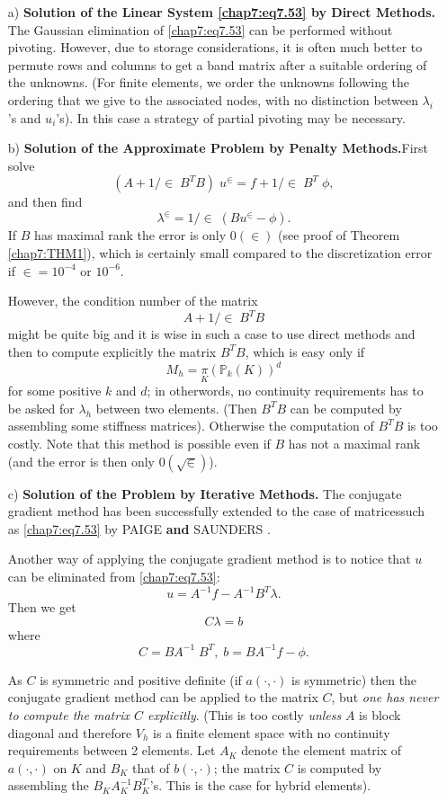 \begin{itemize}
\item [a)] {\bf Solution of the Linear System \eqref{chap7:eq7.53} by
  Direct Methods.} The Gaussian elimination of \eqref{chap7:eq7.53}
  can be performed without pivoting. However, due to storage
  considerations, it is often much better to permute rows and columns
  to get a band matrix after a suitable ordering of the unknowns. (For
  finite elements, we order the unknowns following the ordering that
  we give to the associated nodes, with no distinction between
  $\lambda_i$'s and $u_i$'s). In this case a strategy of partial
  pivoting may be necessary. 
\item [b)] {\bf Solution of the Approximate Problem by Penalty
  Methods.}\pageoriginale First solve 
$$
(A+1/\in \;B^TB)\;u^\in=f+1/\in \;B^T\;\phi,
$$
and then find 
$$
\lambda^\in=1/\in \;(Bu^\in-\phi).
$$
If $B$ has maximal rank the error is only $0(\in)$ (see proof
of Theorem \ref{chap7:THM1}), which is certainly small compared to the
discretization error if $\in =10^{-4}$ or $10^{-6}$. 

However, the condition number of the matrix 
$$
A+1/\in \;B^TB
$$
might be quite big and it is wise in such a case to use direct methods
and then to compute explicitly the matrix $B^TB$, which is easy only
if 
$$
M_h=\underset{K}{\pi}(\mathbb{P}_k(K))^d
$$
for some positive $k$ and $d$; in otherwords, no continuity
requirements has to be asked for $\lambda_h$ between two
elements. (Then $B^TB$ can be computed by assembling some stiffness
matrices). Otherwise the computation of $B^TB$ is too costly. Note
that this method is possible even if $B$ has not a maximal rank (and
the error is then only $0(\sqrt{\in})$).
\item [c)] {\bf Solution of the Problem by Iterative Methods.} The
  conjugate gradient method has been successfully extended to the case
  of matrices\pageoriginale such as \eqref{chap7:eq7.53} by PAIGE {\bf
    and} SAUNDERS \cite{key35}.

\hspace{1cm} Another way of applying the conjugate gradient method is 
to notice that $u$ can be eliminated from \eqref{chap7:eq7.53}:
$$
u=A^{-1}f-A^{-1}B^T\lambda.
$$
Then we get 
$$
C\lambda =b
$$
where
$$
C=BA^{-1}\;B^T,\;b=BA^{-1}f-\phi.
$$

\hspace{1cm} As $C$ is symmetric and positive definite (if $a(\cdotp,\cdotp)$
is symmetric) then the conjugate gradient method can be applied to the
matrix $C$, but \emph{one has never to compute the matrix $C$
  explicitly}. (This is too costly \emph{unless} $A$ is block diagonal
and therefore $V_h$ is a finite element space with no continuity
requirements between 2 elements. Let $A_K$ denote the element matrix
of $a(\cdotp,\cdotp)$ on $K$ and $B_K$ that of $b(\cdotp,\cdotp)$; the
matrix $C$ is computed by assembling the $B_KA_K^{-1}B_K^T$'s. This is
the case for hybrid elements).


\end{itemize}
